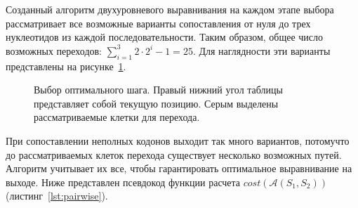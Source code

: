 \indent Созданный алгоритм двухуровневого выравнивания на каждом этапе выбора рассматривает все возможные варианты сопоставления от нуля до трех нуклеотидов из каждой последовательности. Таким образом, общее число возможных переходов: $\sum_{i=1}^3 2\cdot 2^i-1=25$. Для наглядности эти варианты представлены на рисунке~\ref{ris:25variants}. 

\begin{figure}[H]
	\begin{minipage}[h]{0.49\linewidth}
	\end{minipage}
	\hfill
	\begin{minipage}[h]{0.49\linewidth}
	\end{minipage}
	\vfill
	\begin{center}
		\begin{minipage}[h]{0.49\linewidth}
		\end{minipage}
	\end{center}
	\caption{Выбор оптимального шага. Правый нижний угол таблицы представляет собой текущую позицию. Серым выделены рассматриваемые клетки для перехода.}
	\label{ris:25variants}
\end{figure}

\indent При сопоставлении неполных кодонов выходит так много вариантов, потомучто до рассматриваемых клеток перехода существует несколько возможных путей. Алгоритм учитывает их все, чтобы гарантировать оптимальное выравнивание на выходе. Ниже представлен псевдокод функции расчета $cost(\mathcal{A}(S_1, S_2))$ (листинг~\ref{lst:pairwise}).

